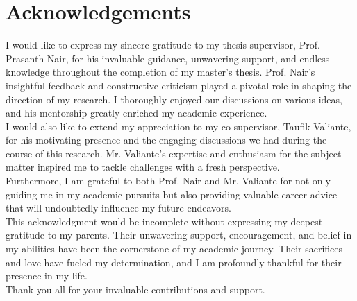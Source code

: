 
\begingroup
\let\clearpage\relax
\let\cleardoublepage\relax

\chapter*{Acknowledgements}

I would like to express my sincere gratitude to my thesis supervisor, Prof. Prasanth Nair, for his invaluable guidance, unwavering support, and endless knowledge throughout the completion of my master's thesis. Prof. Nair's insightful feedback and constructive criticism played a pivotal role in shaping the direction of my research. I thoroughly enjoyed our discussions on various ideas, and his mentorship greatly enriched my academic experience.
\\

I would also like to extend my appreciation to my co-supervisor, Taufik Valiante, for his motivating presence and the engaging discussions we had during the course of this research. Mr. Valiante's expertise and enthusiasm for the subject matter inspired me to tackle challenges with a fresh perspective.
\\

Furthermore, I am grateful to both Prof. Nair and Mr. Valiante for not only guiding me in my academic pursuits but also providing valuable career advice that will undoubtedly influence my future endeavors.
\\

This acknowledgment would be incomplete without expressing my deepest gratitude to my parents. Their unwavering support, encouragement, and belief in my abilities have been the cornerstone of my academic journey. Their sacrifices and love have fueled my determination, and I am profoundly thankful for their presence in my life.
\\

Thank you all for your invaluable contributions and support.


\endgroup
